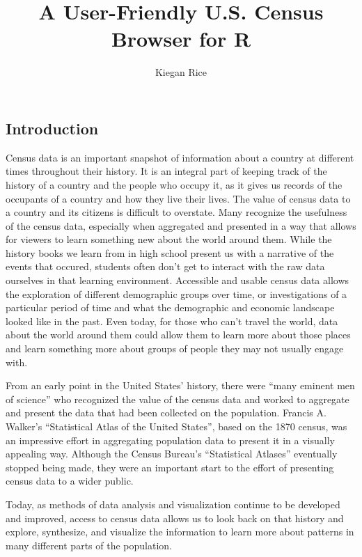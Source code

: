 \documentclass[11pt,]{article}
\title{A User-Friendly U.S. Census Browser for R}
\author{Kiegan Rice}
\date{}
\begin{document}
\maketitle

\subsection{Introduction}\label{introduction}

Census data is an important snapshot of information about a country at
different times throughout their history. It is an integral part of
keeping track of the history of a country and the people who occupy it,
as it gives us records of the occupants of a country and how they live
their lives. The value of census data to a country and its citizens is
difficult to overstate. Many recognize the usefulness of the census
data, especially when aggregated and presented in a way that allows for
viewers to learn something new about the world around them. While the
history books we learn from in high school present us with a narrative
of the events that occured, students often don't get to interact with
the raw data ourselves in that learning environment. Accessible and
usable census data allows the exploration of different demographic
groups over time, or investigations of a particular period of time and
what the demographic and economic landscape looked like in the past.
Even today, for those who can't travel the world, data about the world
around them could allow them to learn more about those places and learn
something more about groups of people they may not usually engage with.

From an early point in the United States' history, there were ``many
eminent men of science'' who recognized the value of the census data and
worked to aggregate and present the data that had been collected on the
population. Francis A. Walker's ``Statistical Atlas of the United
States'', based on the 1870 census, was an impressive effort in
aggregating population data to present it in a visually appealing way.
Although the Census Bureau's ``Statistical Atlases'' eventually stopped
being made, they were an important start to the effort of presenting
census data to a wider public.

Today, as methods of data analysis and visualization continue to be
developed and improved, access to census data allows us to look back on
that history and explore, synthesize, and visualize the information to
learn more about patterns in many different parts of the population.
\end{document}
